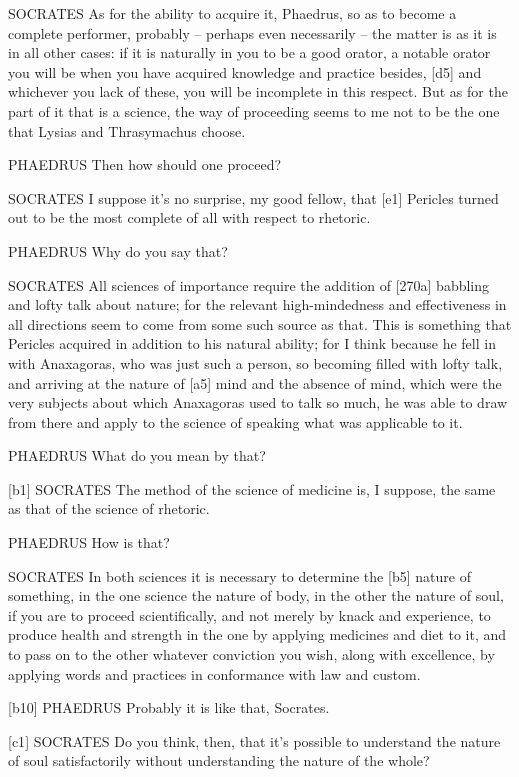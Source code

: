 SOCRATES As for the ability to acquire it, Phaedrus, so as to become a
complete performer, probably -- perhaps even necessarily -- the matter
is as it is in all other cases: if it is naturally in you to be a good
orator, a notable orator you will be when you have acquired knowledge
and practice besides, {[}d5{]} and whichever you lack of these, you will
be incomplete in this respect. But as for the part of it that is a
science, the way of proceeding seems to me not to be the one that Lysias
and Thrasymachus choose.

PHAEDRUS Then how should one proceed?

SOCRATES I suppose it's no surprise, my good fellow, that {[}e1{]}
Pericles turned out to be the most complete of all with respect to
rhetoric.

PHAEDRUS Why do you say that?

SOCRATES All sciences of importance require the addition of {[}270a{]}
babbling and lofty talk
about nature; for the relevant high-mindedness and effectiveness in all
directions seem to come from some such source as that. This is something
that Pericles acquired in addition to his natural ability; for I think
because he fell in with Anaxagoras, who was just such a person, so
becoming filled with lofty talk, and arriving at the nature of {[}a5{]}
mind and the absence of mind, which were the very subjects about which
Anaxagoras used to talk
so much, he was able to draw from there and apply to the science of
speaking what was applicable to it.

PHAEDRUS What do you mean by that?

{[}b1{]} SOCRATES The method of the science of medicine is, I suppose,
the same as that of the science of rhetoric.

PHAEDRUS How is that?

SOCRATES In both sciences it is necessary to determine the {[}b5{]}
nature of something, in the one science the nature of body, in the other
the nature of soul, if you are to proceed scientifically, and not merely
by knack and experience,
to produce health and strength in the one by applying medicines and diet
to it, and to pass on to the other whatever conviction you wish, along
with excellence, by applying
words and practices in
conformance with law and custom.

{[}b10{]} PHAEDRUS Probably it is like that, Socrates.

{[}c1{]} SOCRATES Do you think, then, that it's possible to understand
the nature of soul satisfactorily without understanding the nature of
the whole?

